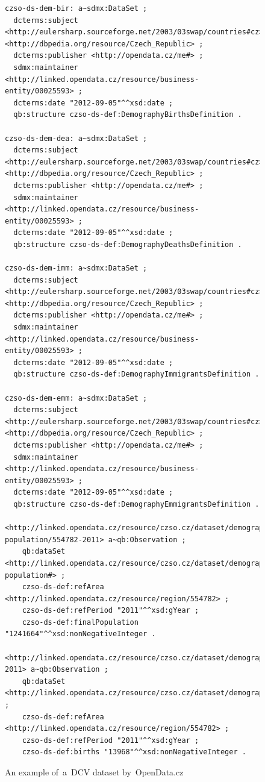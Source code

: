 \begin{figure}
\begin{verbatim}
czso-ds-dem-bir: a~sdmx:DataSet ;
  dcterms:subject <http://eulersharp.sourceforge.net/2003/03swap/countries#cz>, <http://dbpedia.org/resource/Czech_Republic> ;
  dcterms:publisher <http://opendata.cz/me#> ;
  sdmx:maintainer <http://linked.opendata.cz/resource/business-entity/00025593> ;
  dcterms:date "2012-09-05"^^xsd:date ;
  qb:structure czso-ds-def:DemographyBirthsDefinition .
  
czso-ds-dem-dea: a~sdmx:DataSet ;
  dcterms:subject <http://eulersharp.sourceforge.net/2003/03swap/countries#cz>, <http://dbpedia.org/resource/Czech_Republic> ;
  dcterms:publisher <http://opendata.cz/me#> ;
  sdmx:maintainer <http://linked.opendata.cz/resource/business-entity/00025593> ;
  dcterms:date "2012-09-05"^^xsd:date ;
  qb:structure czso-ds-def:DemographyDeathsDefinition .
  
czso-ds-dem-imm: a~sdmx:DataSet ;
  dcterms:subject <http://eulersharp.sourceforge.net/2003/03swap/countries#cz>, <http://dbpedia.org/resource/Czech_Republic> ;
  dcterms:publisher <http://opendata.cz/me#> ;
  sdmx:maintainer <http://linked.opendata.cz/resource/business-entity/00025593> ;
  dcterms:date "2012-09-05"^^xsd:date ;
  qb:structure czso-ds-def:DemographyImmigrantsDefinition .
  
czso-ds-dem-emm: a~sdmx:DataSet ;
  dcterms:subject <http://eulersharp.sourceforge.net/2003/03swap/countries#cz>, <http://dbpedia.org/resource/Czech_Republic> ;
  dcterms:publisher <http://opendata.cz/me#> ;
  sdmx:maintainer <http://linked.opendata.cz/resource/business-entity/00025593> ;
  dcterms:date "2012-09-05"^^xsd:date ;
  qb:structure czso-ds-def:DemographyEmmigrantsDefinition .
  
<http://linked.opendata.cz/resource/czso.cz/dataset/demography/final-population/554782-2011> a~qb:Observation ;
    qb:dataSet <http://linked.opendata.cz/resource/czso.cz/dataset/demography/final-population#> ;
    czso-ds-def:refArea <http://linked.opendata.cz/resource/region/554782> ;
    czso-ds-def:refPeriod "2011"^^xsd:gYear ;
    czso-ds-def:finalPopulation "1241664"^^xsd:nonNegativeInteger .

<http://linked.opendata.cz/resource/czso.cz/dataset/demography/births/554782-2011> a~qb:Observation ;
    qb:dataSet <http://linked.opendata.cz/resource/czso.cz/dataset/demography/births#> ;
    czso-ds-def:refArea <http://linked.opendata.cz/resource/region/554782> ;
    czso-ds-def:refPeriod "2011"^^xsd:gYear ;
    czso-ds-def:births "13968"^^xsd:nonNegativeInteger .
\end{verbatim}\normalsize
\caption{An example of~a~DCV dataset by~OpenData.cz}
\label{fig:example-dcv-dataset}
\end{figure}

